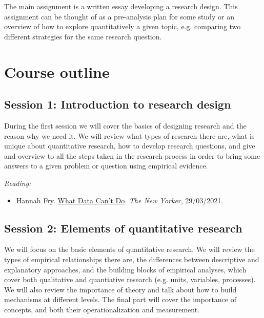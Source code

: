 \documentclass[12pt, a4paper]{article}
\begin{document}
The main assignment is a written essay developing a research design. This assignment can be thought of as a pre-analysis plan for some study or an overview of how to explore quantitatively a given topic, e.g. comparing two different strategies for the same research question.

\newpage
\section{Course outline}

\subsection*{Session 1: Introduction to research design}

During the first session we will cover the basics of designing research and the reason why we need it. We will review what types of research there are, what is unique about quantitative research, how to develop research questions, and give and overview to all the steps taken in the research process in order to bring some answers to a given problem or question using empirical evidence.

\vspace{15pt}\noindent\textit{Reading:}

\begin{itemize}
  \item Hannah Fry. \href{https://www.newyorker.com/magazine/2021/03/29/what-data-cant-do}{What Data Can't Do}. \textit{The New Yorker}, 29/03/2021.
\end{itemize}


\subsection*{Session 2: Elements of quantitative research}

We will focus on the basic elements of quantitative research. We will review the types of empirical relationships there are, the differences between descriptive and explanatory approaches, and the building blocks of empirical analyses, which cover both qualitative and quantiative research (e.g. units, variables, processes). We will also review the importance of theory and talk about how to build mechanisms at different levels. The final part will cover the importance of concepts, and both their operationalization and measurement.
\end{document}
